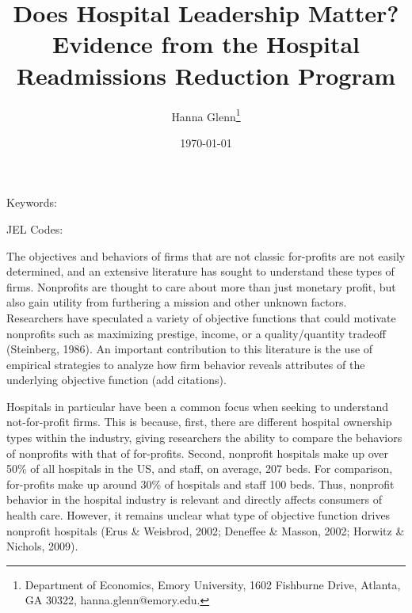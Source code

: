 \documentclass[12pt]{article}
\begin{document}
	
	
	
	
	\linespread{1.2}\title{\vspace{-0.5in} Does Hospital Leadership Matter?\\ \large Evidence from the Hospital Readmissions Reduction Program} 
	
	\date{\today}
	
	\author{\vspace{10mm}Hanna Glenn\footnote{Department of Economics, Emory University, 1602 Fishburne Drive, Atlanta, GA 30322, hanna.glenn@emory.edu.} }
	
	\maketitle
	
	\vspace{-0.2in}
	
	\singlespacing\maketitle
	
	\begin{abstract}
		{\small
			
			
		} 
	\end{abstract}
	
	
	
	
	\vspace{0.1in}
	
	\noindent Keywords: 
	
	\noindent JEL Codes: 
	
	\onehalfspacing
	
	\newpage

  The objectives and behaviors of firms that are not classic for-profits are not easily determined, and an extensive literature has sought to understand these types of firms. Nonprofits are thought to care about more than just monetary profit, but also gain utility from furthering a mission and other unknown factors. Researchers have speculated a variety of objective functions that could motivate nonprofits such as maximizing prestige, income, or a quality/quantity tradeoff (Steinberg, 1986). An important contribution to this literature is the use of empirical strategies to analyze how firm behavior reveals attributes of the underlying objective function (add citations). 
  
  Hospitals in particular have been a common focus when seeking to understand not-for-profit firms. This is because, first, there are different hospital ownership types within the industry, giving researchers the ability to compare the behaviors of nonprofits with that of for-profits. Second, nonprofit hospitals make up over 50\% of all hospitals in the US, and staff, on average, 207 beds. For comparison, for-profits make up around 30\% of hospitals and staff 100 beds. Thus, nonprofit behavior in the hospital industry is relevant and directly affects consumers of health care. However, it remains unclear what type of objective function drives nonprofit hospitals (Erus \& Weisbrod, 2002; Deneffee \& Masson, 2002; Horwitz \& Nichols, 2009). 
  
\end{document}
